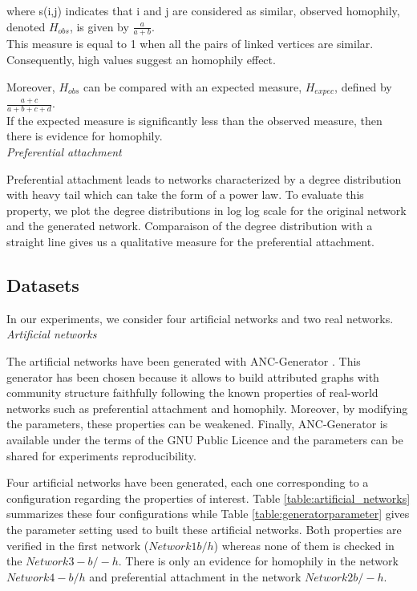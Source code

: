 where  s(i,j) indicates that i and j are considered as similar, observed homophily, denoted $H_{obs}$, is given by $\frac{a}{a+b}$.\\
This measure  is equal to 1 when all the pairs of linked vertices are similar. Consequently, high values suggest an homophily effect.

Moreover, $H_{obs}$ can be compared with an expected measure, $H_{expec}$, defined by  $ \frac{a+c}{a+b+c+d}$.\\

If the expected measure is significantly less than the observed measure, then there is evidence for homophily.\\

\textit{Preferential attachment}

Preferential attachment leads to networks characterized by a degree distribution with heavy tail which can take the form of a power law. To evaluate this property, we  plot the degree distributions in log log scale for the original network and the generated network. Comparaison of the degree distribution with a straight line gives us a qualitative measure for the preferential attachment.\\

\subsection{Datasets}
In our experiments, we consider four artificial networks and two real networks.\\

\textit{Artificial networks}

The artificial networks have been generated with ANC-Generator \cite{largeron2015}. This generator has been chosen because it allows to build attributed graphs with community structure faithfully following the known properties of real-world networks such as preferential attachment and homophily. 
Moreover, by modifying the parameters, these properties can be weakened. Finally, ANC-Generator is available under the terms of the GNU Public Licence and the parameters can be shared for experiments reproducibility. 

Four artificial networks have been generated, each one corresponding to a configuration  regarding the properties of interest.
Table \ref{table:artificial_networks} summarizes these four configurations while Table \ref{table:generatorparameter} gives the parameter setting used to built these artificial networks. Both properties are verified in the first network ($Network1 b/h$) whereas none of them is checked in the $Network3 -b/-h$.  There is only an evidence for homophily in the network $Network4 -b/h$ and  preferential attachment in the network  $Network2 b/-h$.\\ 

